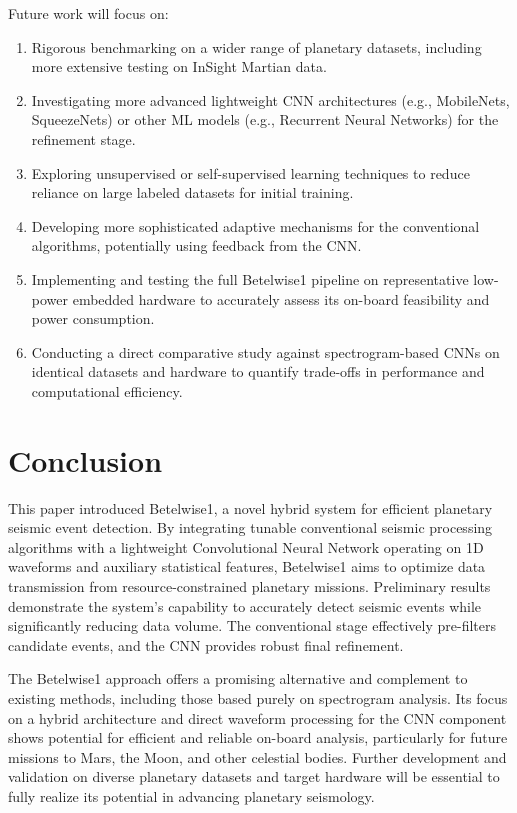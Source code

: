 \documentclass[11pt,a4paper]{article}
\begin{document}
Future work will focus on:
\begin{enumerate}
    \item Rigorous benchmarking on a wider range of planetary datasets, including more extensive testing on InSight Martian data.
    \item Investigating more advanced lightweight CNN architectures (e.g., MobileNets, SqueezeNets) or other ML models (e.g., Recurrent Neural Networks) for the refinement stage.
    \item Exploring unsupervised or self-supervised learning techniques to reduce reliance on large labeled datasets for initial training.
    \item Developing more sophisticated adaptive mechanisms for the conventional algorithms, potentially using feedback from the CNN.
    \item Implementing and testing the full Betelwise1 pipeline on representative low-power embedded hardware to accurately assess its on-board feasibility and power consumption.
    \item Conducting a direct comparative study against spectrogram-based CNNs on identical datasets and hardware to quantify trade-offs in performance and computational efficiency.
\end{enumerate}

\section{Conclusion}
This paper introduced Betelwise1, a novel hybrid system for efficient planetary seismic event detection. By integrating tunable conventional seismic processing algorithms with a lightweight Convolutional Neural Network operating on 1D waveforms and auxiliary statistical features, Betelwise1 aims to optimize data transmission from resource-constrained planetary missions. Preliminary results demonstrate the system's capability to accurately detect seismic events while significantly reducing data volume. The conventional stage effectively pre-filters candidate events, and the CNN provides robust final refinement.

The Betelwise1 approach offers a promising alternative and complement to existing methods, including those based purely on spectrogram analysis. Its focus on a hybrid architecture and direct waveform processing for the CNN component shows potential for efficient and reliable on-board analysis, particularly for future missions to Mars, the Moon, and other celestial bodies. Further development and validation on diverse planetary datasets and target hardware will be essential to fully realize its potential in advancing planetary seismology.
\end{document}
